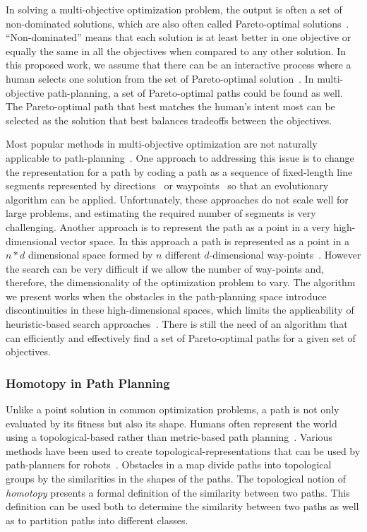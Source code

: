 \documentclass[phd]{byuprop}
\begin{document}
In solving a multi-objective optimization problem, the output is often a set of non-dominated solutions, which are also often called Pareto-optimal solutions~\cite{Miettinen1999}.
``Non-dominated''  means that each solution is at least better in one objective or equally the same in all the objectives when compared to any other solution.
In this proposed work, we assume that there can be an interactive process where a human selects one solution from the set of Pareto-optimal solution~\cite{Marler2004}.
In multi-objective path-planning, a set of Pareto-optimal paths could be found as well.
The Pareto-optimal path that best matches the human's intent most can be selected as the solution that best balances tradeoffs between the objectives.

Most popular methods in multi-objective optimization are not naturally applicable to path-planning~\cite{Zhang2007,Deb2014}.
One approach to addressing this issue is to change the representation for a path by coding a path as a sequence of fixed-length line segments represented by directions~\cite{Ahmed2013,Howlett2006} or waypoints~\cite{Sujit2009,Pires2004} so that an evolutionary algorithm can be applied. 
Unfortunately, these approaches do not scale well for large problems, and estimating the required number of segments is very challenging. 
Another approach is to represent the path as a point in a very high-dimensional vector space.
In this approach a path is represented as a point in a $ n * d $ dimensional space formed by $ n $ different  $d$-dimensional way-points~\cite{Ahmed2011,Ahmed2013}.
However the search can be very difficult if we allow the number of way-points and, therefore, the dimensionality of the optimization problem to vary. 
The algorithm we present works when the obstacles in the path-planning space introduce discontinuities in these high-dimensional spaces, which limits the applicability of heuristic-based search approaches~\cite{Sujit2009,Zhang2007}.
There is still the need of an algorithm that can efficiently and effectively find a set of Pareto-optimal paths for a given set of objectives.

\subsubsection{Homotopy in Path Planning}
\label{sec:related_work:algorithm_specific_work:homotopy_in_path_planning}


Unlike a point solution in common optimization problems, a path is not only evaluated by its fitness but also its shape.
Humans often represent the world using a topological-based rather than metric-based path planning~\cite{Aginsky1997,kuipers1999}. 
Various methods have been used to create topological-representations that can be used by path-planners for robots~\cite{Mataric1992,Thrun1998,Fasola2013,Shah2013}.
Obstacles in a map divide paths into topological groups by the similarities in the shapes of the paths. 
The topological notion of {\em homotopy} presents a formal definition of the similarity between two paths. 
This definition can be used both to determine the similarity between two paths as well as to partition paths into different classes.
\end{document}
